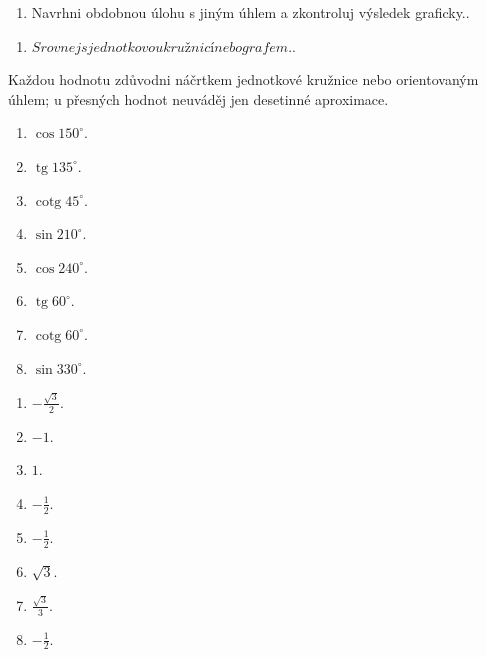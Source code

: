 \documentclass[11pt,a4paper]{article}
\begin{document}
\begin{zadaniReseniBox}[title={Rozšíření 1}]
\begin{enumerate}[label=\alph*)]
\item Navrhni obdobnou úlohu s jiným úhlem a zkontroluj výsledek graficky..
\end{enumerate}
\tcblower
\begin{enumerate}[label=\alph*)]
\item $Srovnej s jednotkovou kružnicí nebo grafem.$.
\end{enumerate}
\end{zadaniReseniBox}
Každou hodnotu zdůvodni náčrtkem jednotkové kružnice nebo orientovaným úhlem; u přesných hodnot neuváděj jen desetinné aproximace.
\begin{zadaniReseniBox}[title={Domácí úkol}]
\begin{enumerate}[label=\alph*)]
\item $\cos150^\circ$.
\item $\operatorname{tg}135^\circ$.
\item $\operatorname{cotg}45^\circ$.
\item $\sin210^\circ$.
\item $\cos240^\circ$.
\item $\operatorname{tg}60^\circ$.
\item $\operatorname{cotg}60^\circ$.
\item $\sin330^\circ$.
\end{enumerate}
\tcblower
\begin{enumerate}[label=\alph*)]
\item $-\frac{\sqrt3}{2}$.
\item $-1$.
\item $1$.
\item $-\frac{1}{2}$.
\item $-\frac{1}{2}$.
\item $\sqrt3$.
\item $\frac{\sqrt3}{3}$.
\item $-\frac{1}{2}$.
\end{enumerate}
\end{zadaniReseniBox}
\end{document}
